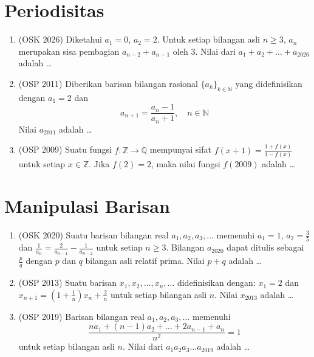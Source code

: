 \documentclass[12pt]{scrartcl}
\begin{document}
\section{Periodisitas}

\begin{enumerate}[resume]

	\item (OSK 2026)
	Diketahui $a_{1}=0$, $a_{2}=2$. Untuk setiap bilangan asli $n\ge3$, $a_{n}$ merupakan sisa pembagian $a_{n-2}+a_{n-1}$ oleh 3. Nilai dari $a_{1}+a_{2}+\dots+a_{2026}$ adalah \dots

	\item (OSP 2011)
	Diberikan barisan bilangan rasional $\{a_k\}_{k \in \mathbb{N}}$ yang didefinisikan dengan $a_1=2$ dan
	\[ a_{n+1}=\frac{a_n-1}{a_n+1}, \quad n \in \mathbb{N} \]
	Nilai $a_{2011}$ adalah \dots

	\item (OSP 2009)
	Suatu fungsi $f : \mathbb{Z} \rightarrow \mathbb{Q}$ mempunyai sifat $f(x+1) = \frac{1+f(x)}{1-f(x)}$ untuk setiap $x \in \mathbb{Z}$. Jika $f(2) = 2$, maka nilai fungsi $f(2009)$ adalah \dots

\end{enumerate}

\section{Manipulasi Barisan}

\begin{enumerate}[resume]

	\item (OSK 2020)
	Suatu barisan bilangan real $a_{1},a_{2},a_{3},\dots$ memenuhi $a_{1}=1$, $a_{2}=\frac{3}{5}$ dan $\frac{1}{a_{n}}=\frac{2}{a_{n-1}}-\frac{1}{a_{n-2}}$ untuk setiap $n\ge 3$. Bilangan $a_{2020}$ dapat ditulis sebagai $\frac{p}{q}$ dengan $p$ dan $q$ bilangan asli relatif prima. Nilai $p+q$ adalah \dots

	\item (OSP 2013)
	Suatu barisan $x_1, x_2, \dots, x_n, \dots$ didefinisikan dengan: $x_1=2$ dan $x_{n+1}=(1+\frac{1}{n})x_n+\frac{2}{n}$ untuk setiap bilangan asli $n$. Nilai $x_{2013}$ adalah \dots

	\item (OSP 2019)
	Barisan bilangan real $a_1, a_2, a_3, \dots$ memenuhi
	\[ \frac{na_1+(n-1)a_2+\dots+2a_{n-1}+a_n}{n^2}=1 \]
	untuk setiap bilangan asli $n$. Nilai dari $a_1a_2a_3\dots a_{2019}$ adalah \dots

\end{enumerate}
\end{document}
